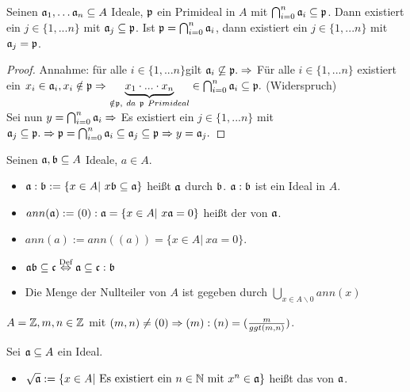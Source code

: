 \begin{bem} \label{11.7}
	Seinen $ \mathfrak{a}_1, \dots \mathfrak{a}_n \subseteq A$ Ideale, $\mathfrak{p} $ ein Primideal in $A$ mit $ \bigcap_{i = 0}^{n} \mathfrak{a}_i \subseteq \mathfrak{p}$. Dann existiert ein $j \in \{1,...n\} $ mit $\mathfrak{a}_j  \subseteq \mathfrak{p}$. Ist $\mathfrak{p} =\bigcap_{i = 0}^{n} \mathfrak{a}_i$, dann existiert ein $j \in \{1,...n\} $ mit $\mathfrak{a}_j = \mathfrak{p}$.
\end{bem}
\begin{proof}
	Annahme: für alle $i \in \{1,...n\} $gilt $ \mathfrak{a}_i \not \subseteq \mathfrak{p}. \Rightarrow $ Für alle $i \in \{1,...n\} $ existiert ein $x_i \in \mathfrak{a}_i, x_i \notin \mathfrak{p} \Rightarrow \underbrace{x_1 \cdot ... \cdot x_n}_{\notin \mathfrak{p}, \ da \ \mathfrak{p} \  Primideal} \in \bigcap_{i = 0}^{n} \mathfrak{a}_i \subseteq \mathfrak{p}. $ (Widerspruch)\\
	Sei nun $ y = \bigcap_{i = 0}^{n} \mathfrak{a}_i \Rightarrow $ 	Es existiert ein $j \in \{1,...n\} $ mit $ \mathfrak{a}_j \subseteq \mathfrak{p}.  \\
	\Rightarrow \mathfrak{p} =\bigcap_{i = 0}^{n} \mathfrak{a}_i \subseteq \mathfrak{a}_j \subseteq \mathfrak{p} \Rightarrow y = \mathfrak{a}_j.$ 
\end{proof}
\begin{bem+df}
	Seinen $\mathfrak{a}, \mathfrak{b} \subseteq A $ Ideale, $a \in A $.
	\begin{itemize}
		\item[] $\mathfrak{a} : \mathfrak{b} := \{x \in A | \ x \mathfrak{b} \subseteq \mathfrak{a} \} $ heißt  $\mathfrak{a} $ durch $\mathfrak{b}$. $\mathfrak{a} : \mathfrak{b} $ ist ein Ideal in $A$. 
		\item[] $ann(\mathfrak{a}) := (0) : \mathfrak{a} = \{x \in A | \ x \mathfrak{a} = 0\} $ heißt der  von $\mathfrak{a}$.
		\item[] $ann(a) := ann((a)) = \{x \in A| \ xa = 0\} $.
	\end{itemize}
\end{bem+df}
\begin{anm}
	\begin{itemize}
		\item $\mathfrak{a} \mathfrak{b} \subseteq \mathfrak{c} \overset{\text{Def}}{\Leftrightarrow} \mathfrak{a} \subseteq \mathfrak{c} : \mathfrak{b} $
		\item Die Menge der Nullteiler von $A$ ist gegeben durch $\bigcup_{ x \in A \backslash{0}} ann(x)$
	\end{itemize}
\end{anm}
\begin{bsp}
	$A = \mathbb{Z}, m,n \in \mathbb{Z} $ mit $(m,n) \neq (0) \Rightarrow (m): (n) = (\frac{m}{ggt(m,n)})$.
\end{bsp}
\begin{df}
	Sei $\mathfrak{a} \subseteq A$ ein Ideal. 
	\begin{itemize}
		\item[] $\sqrt{\mathfrak{a}} := \{x \in A | \ \text{Es existiert ein } n \in \mathbb{N} \ \text{mit } x^n \in \mathfrak{a} \} $ heißt das  von $\mathfrak{a} $. 
	\end{itemize}
\end{df}
